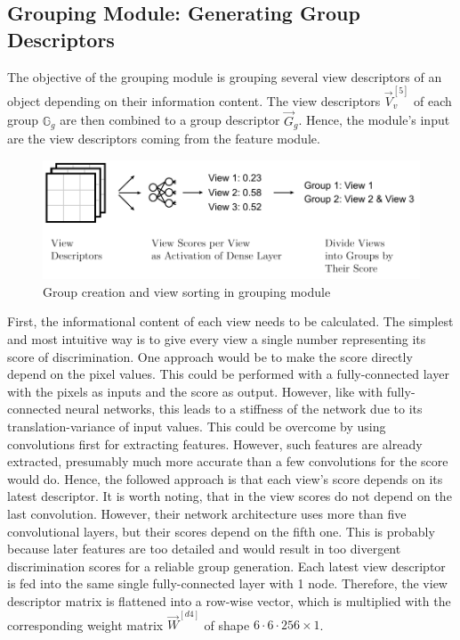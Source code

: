 \subsection{Grouping Module: Generating Group Descriptors}
\label{sec:architecture-grouping-module}
The objective of the grouping module is grouping several view descriptors of an object depending on their information content.
The view descriptors $\vec{V}^{[5]}_v$ of each group $\mathbb{G}_g$ are then combined to a group descriptor $\vec{G}_g$.
Hence, the module's input are the view descriptors coming from the feature module.
\begin{figure}
	\centering
	\includegraphics[]{images/grouping_module_groups.pdf}
	\caption{Group creation and view sorting in grouping module}
	\label{fig:grouping-module-groups}
\end{figure}
First, the informational content of each view needs to be calculated.
The simplest and most intuitive way is to give every view a single number representing its score of discrimination.
One approach would be to make the score directly depend on the pixel values.
This could be performed with a fully-connected layer with the pixels as inputs and the score as output.
However, like with fully-connected neural networks, this leads to a stiffness of the network due to its translation-variance of input values. 
This could be overcome by using convolutions first for extracting features.
However, such features are already extracted, presumably much more accurate than a few convolutions for the score would do. 
Hence, the followed approach is that each view's score depends on its latest descriptor.
It is worth noting, that in \cite{Feng2018} the view scores do not depend on the last convolution.
However, their network architecture uses more than five convolutional layers, but their scores depend on the fifth one.
This is probably because later features are too detailed and would result in too divergent discrimination scores for a reliable group generation.
Each latest view descriptor is fed into the same single fully-connected layer with 1 node.
Therefore, the view descriptor matrix is flattened into a row-wise vector, which is multiplied with the corresponding weight matrix $\vec{W}^{[d4]}$ of shape $6 \cdot 6 \cdot 256 \times 1$.
